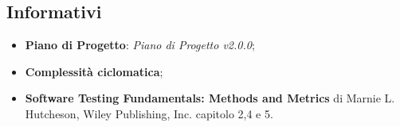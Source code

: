 \subsection{Informativi}\label{rfinf}
\begin{itemize}
	\item \textbf{Piano di Progetto}: \textit{Piano di Progetto v2.0.0};
	\item \textbf{Complessità ciclomatica};
	\item \textbf{Software Testing Fundamentals: Methods and Metrics} di Marnie L. Hutcheson, Wiley Publishing, Inc. capitolo 2,4 e 5.
\end{itemize}
